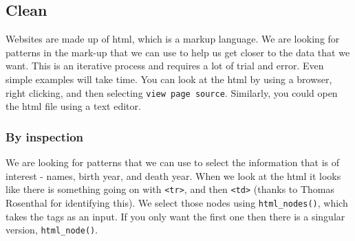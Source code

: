 \documentclass[
]{book}
\newenvironment{Shaded}{\begin{snugshade}}{\end{snugshade}}
\newcommand{\CommentTok}[1]{\textcolor[rgb]{0.56,0.35,0.01}{\textit{#1}}}
\newcommand{\KeywordTok}[1]{\textcolor[rgb]{0.13,0.29,0.53}{\textbf{#1}}}
\newcommand{\NormalTok}[1]{#1}
\newcommand{\OperatorTok}[1]{\textcolor[rgb]{0.81,0.36,0.00}{\textbf{#1}}}
\newcommand{\StringTok}[1]{\textcolor[rgb]{0.31,0.60,0.02}{#1}}
\begin{document}
\hypertarget{clean-1}{%
\subsection{Clean}\label{clean-1}}

Websites are made up of html, which is a markup language. We are looking for patterns in the mark-up that we can use to help us get closer to the data that we want. This is an iterative process and requires a lot of trial and error. Even simple examples will take time. You can look at the html by using a browser, right clicking, and then selecting \texttt{view\ page\ source}. Similarly, you could open the html file using a text editor.

\hypertarget{by-inspection}{%
\subsubsection{By inspection}\label{by-inspection}}

We are looking for patterns that we can use to select the information that is of interest - names, birth year, and death year. When we look at the html it looks like there is something going on with \texttt{\textless{}tr\textgreater{}}, and then \texttt{\textless{}td\textgreater{}} (thanks to Thomas Rosenthal for identifying this). We select those nodes using \texttt{html\_nodes()}, which takes the tags as an input. If you only want the first one then there is a singular version, \texttt{html\_node()}.

\begin{Shaded}
\end{Shaded}
\end{document}
